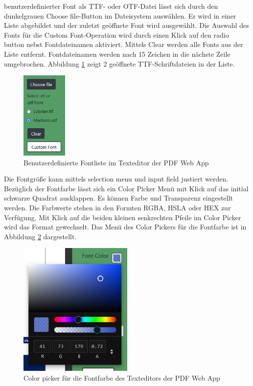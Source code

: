 benutzerdefinierter Font als TTF- oder OTF-Datei lässt sich durch den dunkelgrauen Choose file-Button im Dateisystem auswählen. Er wird in einer Liste abgebildet und der zuletzt geöffnete Font wird ausgewählt. Die Auswahl des Fonts für die Custom Font-Operation wird durch einen Klick auf den radio button nebst Fontdateinamen aktiviert. Mittels Clear werden alle Fonts aus der Liste entfernt. Fontdateinamen werden nach 15 Zeichen in die nächste Zeile umgebrochen. Abbildung \ref{fig:custom-font} zeigt 2 geöffnete TTF-Schriftdateien in der Liste.

\begin{figure}[!htbp]
	\centering
	\includegraphics[width=0.2\textwidth]{"images/custom-font.png"}
	\caption{Benutzerdefinierte Fontliste im Texteditor der PDF Web App}
	\label{fig:custom-font}
\end{figure}

Die Fontgröße kann mittels selection menu und input field justiert werden. Bezüglich der Fontfarbe lässt sich ein Color Picker Menü mit Klick auf das initial schwarze Quadrat ausklappen. Es können Farbe und Transparenz eingestellt werden. Die Farbwerte stehen in den Formten RGBA, HSLA oder HEX zur Verfügung. Mit Klick auf die beiden kleinen senkrechten Pfeile im Color Picker wird das Format gewechselt. Das Menü des Color Pickers für die Fontfarbe ist in Abbildung \ref{fig:fontcolor} dargestellt. 

\begin{figure}[!htbp]
	\centering
	\includegraphics[width=0.5\textwidth]{"images/fontcolor.png"}
	\caption{Color picker für die Fontfarbe des Texteditors der PDF Web App}
	\label{fig:fontcolor}
\end{figure}

